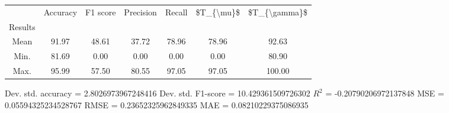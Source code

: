 \begin{tabular}{|c|c|c|c|c|c|c|}
\toprule
{} &  Accuracy &  F1 score &  Precision &  Recall &  \$T\_\{\textbackslash mu\}\$ &  \$T\_\{\textbackslash gamma\}\$ \\
Results &           &           &            &         &            &               \\
\hline
Mean    &     91.97 &     48.61 &      37.72 &   78.96 &      78.96 &         92.63 \\
Min.    &     81.69 &      0.00 &       0.00 &    0.00 &       0.00 &         80.90 \\
Max.    &     95.99 &     57.50 &      80.55 &   97.05 &      97.05 &        100.00 \\
\bottomrule
\end{tabular}

 Dev. std. accuracy = 2.8026973967248416
 Dev. std. F1-score = 10.429361509726302
 $R^2$ = -0.20790206972137848
 MSE = 0.05594325234528767
 RMSE = 0.23652325962849335
 MAE = 0.08210229375086935
